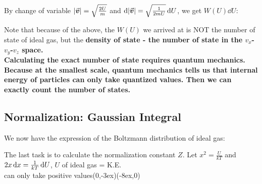 \documentclass[class=article, crop=false, 12pt]{standalone}
\begin{document}
By change of variable $|\va*{v}| = \sqrt{\frac{2U}{m}}$ and $\dd{|\va*{v}|} = \sqrt{\frac{1}{2mU}}\dd{U}$,
we get $W(U)\dd{U}$:

\begin{notation}
    Note that because of the  above,
    the $W(U)$ we arrived at is NOT the number of state of ideal gas,
    but the \bf{density of state} - the number of state  in the $v_x$-$v_y$-$v_z$ space.\\

    Calculating the exact number of state requires quantum mechanics.
    Because at the smallest scale, 
    quantum mechanics tells us that internal energy of particles can only take quantized values.
    Then we can exactly count the number of states.
\end{notation}


\subsection{Normalization: Gaussian Integral}

We now have the expression of the Boltzmann distribution of ideal gas:

The last task is to calculate the normalization constant $Z$. 
Let $x^2 = \frac{U}{kT}$ and $2x\dd{x} = \frac{1}{kT}\dd{U}$,
{\scriptsize $U$ of ideal gas = K.E.\\[-1ex]\scriptsize can only take positive values}{(0,-3ex)}{(-8ex,0)}
\end{document}
